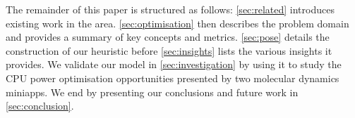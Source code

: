 The remainder of this paper is structured as follows: \autoref{sec:related} introduces existing work in the area. 
\autoref{sec:optimisation} then describes the problem domain and provides a summary of key concepts and metrics.
\autoref{sec:pose} details the construction of our heuristic before \autoref{sec:insights} lists the various insights it provides.
We validate our model in \autoref{sec:investigation} by using it to study the CPU power optimisation opportunities presented by two molecular dynamics miniapps. 
We end by presenting our conclusions and future work in \autoref{sec:conclusion}.
